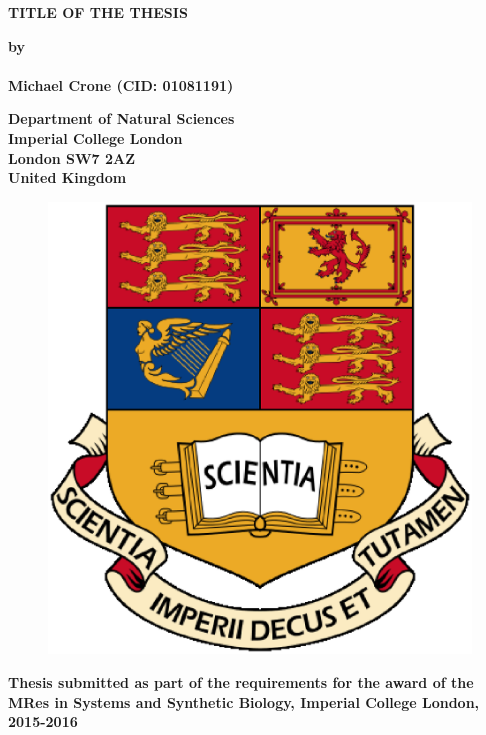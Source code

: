 \thispagestyle{empty}
\null\vskip0.2in%
\begin{center}
\LARGE{{\bf 
TITLE OF THE THESIS}}
\end{center}

\vspace{0.5cm}

\begin{center}
{\Large {\bf by}}\\
\mbox{} \\
{\Large {\bf Michael Crone (CID: 01081191)}}
\end{center}

\vspace{1cm}

\begin{center}
\large{\bf{Department of Natural Sciences \\ Imperial College London \\
London SW7 2AZ \\ United Kingdom}}
\end{center}


\vspace{1.5cm}

\begin{figure}[!h]
\centering
\includegraphics[scale=0.4]{IC_Crest.eps}
\end{figure}

\vspace{1.5cm}

\begin{center}
\large{\bf{Thesis submitted as part of the requirements for the award of the \\
MRes in Systems and Synthetic Biology, Imperial College London, 2015-2016}}
\end{center}

\vspace{2cm}

